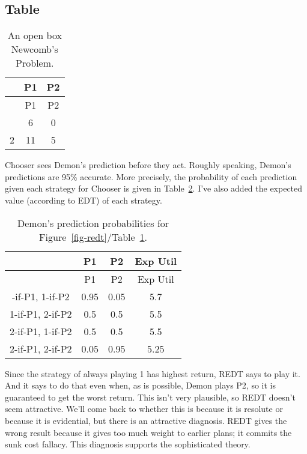 \documentclass[
  11pt,
  letterpaper,
  DIV=11,
  numbers=noendperiod,
  twoside]{scrartcl}
\begin{document}
\subsection{Table}

\begin{longtable}[]{@{}ccc@{}}
\caption{An open box Newcomb's Problem.}\label{tbl-redt}\tabularnewline
\toprule\noalign{}
& P1 & P2 \\
\midrule\noalign{}
\endfirsthead
\toprule\noalign{}
& P1 & P2 \\
\midrule\noalign{}
\endhead
\bottomrule\noalign{}
\endlastfoot
1 & 6 & 0 \\
2 & 11 & 5 \\
\end{longtable}

Chooser sees Demon's prediction before they act. Roughly speaking,
Demon's predictions are 95\% accurate. More precisely, the probability
of each prediction given each strategy for Chooser is given in
Table~\ref{tbl-redt-strategy}. I've also added the expected value
(according to EDT) of each strategy.

\begin{longtable}[]{@{}cccc@{}}
\caption{Demon's prediction probabilities for
Figure~\ref{fig-redt}/Table~\ref{tbl-redt}.}\label{tbl-redt-strategy}\tabularnewline
\toprule\noalign{}
& P1 & P2 & Exp Util \\
\midrule\noalign{}
\endfirsthead
\toprule\noalign{}
& P1 & P2 & Exp Util \\
\midrule\noalign{}
\endhead
\bottomrule\noalign{}
\endlastfoot
1-if-P1, 1-if-P2 & 0.95 & 0.05 & 5.7 \\
1-if-P1, 2-if-P2 & 0.5 & 0.5 & 5.5 \\
2-if-P1, 1-if-P2 & 0.5 & 0.5 & 5.5 \\
2-if-P1, 2-if-P2 & 0.05 & 0.95 & 5.25 \\
\end{longtable}

Since the strategy of always playing 1 has highest return, REDT says to
play it. And it says to do that even when, as is possible, Demon plays
P2, so it is guaranteed to get the worst return. This isn't very
plausible, so REDT doesn't seem attractive. We'll come back to whether
this is because it is resolute or because it is evidential, but there is
an attractive diagnosis. REDT gives the wrong result because it gives
too much weight to earlier plans; it commits the sunk cost fallacy. This
diagnosis supports the sophisticated theory.
\end{document}
